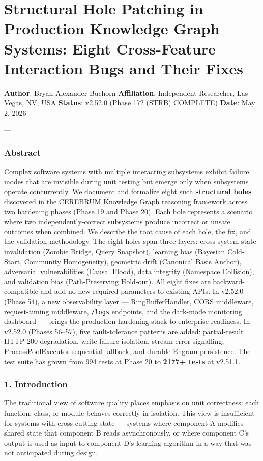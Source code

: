 \section{Structural Hole Patching in Production Knowledge Graph Systems: Eight Cross-Feature Interaction Bugs and Their Fixes}

\textbf{Author}: Bryan Alexander Buchorn  
\textbf{Affiliation}: Independent Researcher, Las Vegas, NV, USA  
\textbf{Status}: v2.52.0 (Phase 172 (STRB) COMPLETE)
\textbf{Date}: May 2, 2026

---

\subsubsection{Abstract}
Complex software systems with multiple interacting subsystems exhibit failure modes that are invisible during unit testing but emerge only when subsystems operate concu\-rrently. We document and formalize eight such \textbf{structural holes} discovered in the CEREBRUM Knowledge Graph reasoning framework across two hardening phases (Phase 19 and Phase 20). Each hole represents a scenario where two indep\-endently-correct subsystems produce incorrect or unsafe outcomes when combined. We describe the root cause of each hole, the fix, and the validation methodology. The eight holes span three layers: cross-system state inval\-idation (Zombie Bridge, Query Snapshot), learning bias (Bayesian Cold-Start, Community Homogeneity), geometric drift (Canonical Basis Anchor), adversarial vulne\-rabilities (Causal Flood), data integrity (Namespace Collision), and validation bias (Path-Preserving Hold-out). All eight fixes are backward-compatible and add no new required parameters to existing APIs. In v2.52.0 (Phase 54), a new obser\-vability layer — RingBufferHandler, CORS middleware, request-timing middleware, \texttt{/logs} endpoints, and the dark-mode monitoring dashboard — brings the production hardening stack to enterprise readiness. In v2.52.0 (Phases 56–57), five fault-tolerance patterns are added: partial-result HTTP 200 degradation, write-failure isolation, stream error signalling, ProcessPoolExecutor sequential fallback, and durable Engram persistence. The test suite has grown from 994 tests at Phase 20 to \textbf{2177+ tests} at v2.51.1.

\subsubsection{1. Introd\-uction}
The traditional view of software quality places emphasis on unit correctness: each function, class, or module behaves correctly in isolation. This view is insuf\-ficient for systems with cross-cutting state — systems where component A modifies shared state that component B reads async\-hronously, or where component C's output is used as input to component D's learning algorithm in a way that was not anticipated during design.

